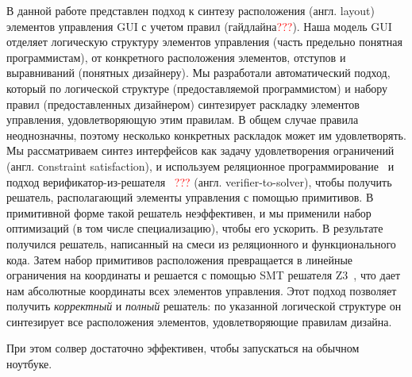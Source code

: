 В данной работе представлен подход к синтезу расположения (англ. layout) элементов управления GUI  с учетом правил (гайдлайна\textcolor{red}{???}). Наша модель GUI отделяет логическую структуру элементов управления (часть предельно понятная программистам), от конкретного расположения элементов, отступов и выравниваний (понятных дизайнеру).
Мы разработали автоматический подход, который по логической структуре (предоставляемой программистом) и набору правил (предоставленных дизайнером) синтезирует раскладку элементов управления, удовлетворяющую этим правилам.
В общем случае правила неоднозначны, поэтому несколько конкретных раскладок может им удовлетворять.
Мы рассматриваем синтез интерфейсов как задачу удовлетворения ограничений (англ. сonstraint satisfaction), и используем реляционное программирование~\cite{TRS} и подход
верификатор-из-решателя~\cite{searchproblems} \textcolor{red}{???} (англ. verifier-to-solver), чтобы получить решатель, располагающий элементы управления с помощью примитивов.
В примитивной форме такой решатель неэффективен, и мы применили набор оптимизаций (в том числе специализацию), чтобы его ускорить. В результате получился решатель, написанный на смеси из реляционного и функционального кода. Затем набор примитивов расположения превращается в линейные ограничения на координаты и решается с помощью SMT решателя Z3~\cite{Zthree}, что дает нам абсолютные координаты всех элементов управления.
Этот подход позволяет получить \emph{корректный} и \emph{полный} решатель: по указанной логической структуре он синтезирует все расположения элементов, удовлетворяющие правилам дизайна.

При этом солвер достаточно эффективен, чтобы запускаться на обычном ноутбуке.

